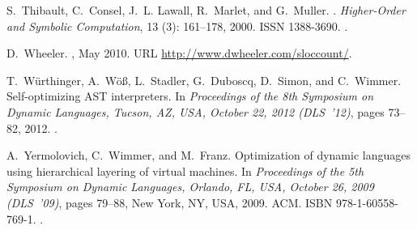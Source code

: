\documentclass[preprint,10pt]{popl14conf}
\begin{document}
\begin{thebibliography}{46}
S.~Thibault, C.~Consel, J.~L. Lawall, R.~Marlet, and G.~Muller.
.
\newblock \emph{Higher-Order and Symbolic Computation}, 13
  (3): 161--178, 2000.
\newblock ISSN 1388-3690.
\newblock {}.

D.~Wheeler.
, May 2010.
\newblock URL \url{http://www.dwheeler.com/sloccount/}.

T.~W{\"u}rthinger, A.~W{\"o}{\ss}, L.~Stadler, G.~Duboscq, D.~Simon, and
  C.~Wimmer.
\newblock Self-optimizing {AST} interpreters.
\newblock In \emph{Proceedings of the 8th {Symposium on Dynamic Languages},
  Tucson, AZ, USA, October 22, 2012 (DLS~'12)}, pages 73--82, 2012.
\newblock {}.

A.~Yermolovich, C.~Wimmer, and M.~Franz.
\newblock Optimization of dynamic languages using hierarchical layering of
  virtual machines.
\newblock In \emph{Proceedings of the 5th {Symposium on Dynamic Languages},
  Orlando, FL, USA, October 26, 2009 (DLS~'09)}, pages 79--88, New York, NY,
  USA, 2009. ACM.
\newblock ISBN 978-1-60558-769-1.
\newblock {}.

\end{thebibliography}
\end{document}
